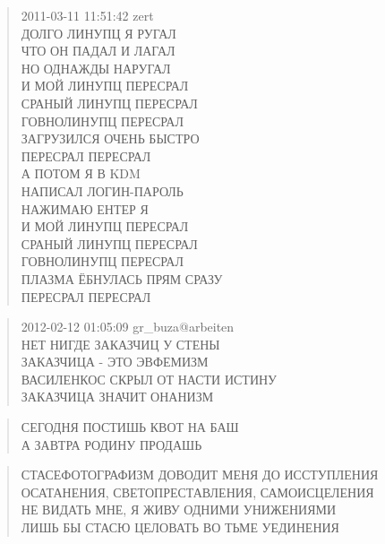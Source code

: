 \poemtitle{***}
\begin{verse}
2011-03-11 11:51:42 zert\\
ДОЛГО ЛИНУПЦ Я РУГАЛ\\
ЧТО ОН ПАДАЛ И ЛАГАЛ\\
НО ОДНАЖДЫ НАРУГАЛ\\
И МОЙ ЛИНУПЦ ПЕРЕСРАЛ\\
СРАНЫЙ ЛИНУПЦ ПЕРЕСРАЛ\\
ГОВНОЛИНУПЦ ПЕРЕСРАЛ\\
ЗАГРУЗИЛСЯ ОЧЕНЬ БЫСТРО\\
ПЕРЕСРАЛ ПЕРЕСРАЛ\\
А ПОТОМ Я В KDM\\
НАПИСАЛ ЛОГИН-ПАРОЛЬ\\
НАЖИМАЮ ЕНТЕР Я\\
И МОЙ ЛИНУПЦ ПЕРЕСРАЛ\\
СРАНЫЙ ЛИНУПЦ ПЕРЕСРАЛ\\
ГОВНОЛИНУПЦ ПЕРЕСРАЛ\\
ПЛАЗМА ЁБНУЛАСЬ ПРЯМ СРАЗУ\\
ПЕРЕСРАЛ ПЕРЕСРАЛ
\end{verse}

\poemtitle{***}
\begin{verse}
2012-02-12 01:05:09 gr\_buza@arbeiten\\
НЕТ НИГДЕ ЗАКАЗЧИЦ У СТЕНЫ\\
ЗАКАЗЧИЦА - ЭТО ЭВФЕМИЗМ\\
ВАСИЛЕНКОС СКРЫЛ ОТ НАСТИ ИСТИНУ\\
ЗАКАЗЧИЦА ЗНАЧИТ ОНАНИЗМ
\end{verse}

\poemtitle{***}
\begin{verse}
СЕГОДНЯ ПОСТИШЬ КВОТ НА БАШ\\
А ЗАВТРА РОДИНУ ПРОДАШЬ
\end{verse}

\poemtitle{***}
\begin{verse}
СТАСЕФОТОГРАФИЗМ ДОВОДИТ МЕНЯ ДО ИССТУПЛЕНИЯ\\
ОСАТАНЕНИЯ, СВЕТОПРЕСТАВЛЕНИЯ, САМОИСЦЕЛЕНИЯ\\
НЕ ВИДАТЬ МНЕ, Я ЖИВУ ОДНИМИ УНИЖЕНИЯМИ\\
ЛИШЬ БЫ СТАСЮ ЦЕЛОВАТЬ ВО ТЬМЕ УЕДИНЕНИЯ
\end{verse}


